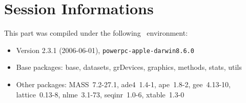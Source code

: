 \documentclass{article}
\begin{document}
\section{Session Informations}

This part was compiled under the following \Rlogo{}~environment:

\begin{itemize}
  \item Version 2.3.1 (2006-06-01), \verb|powerpc-apple-darwin8.6.0|
  \item Base packages: base, datasets, grDevices, graphics, methods,
    stats, utils
  \item Other packages: MASS~7.2-27.1, ade4~1.4-1, ape~1.8-2,
    gee~4.13-10, lattice~0.13-8, nlme~3.1-73, seqinr~1.0-6,
    xtable~1.3-0
\end{itemize}%

\clearpage
{}


\end{document}

